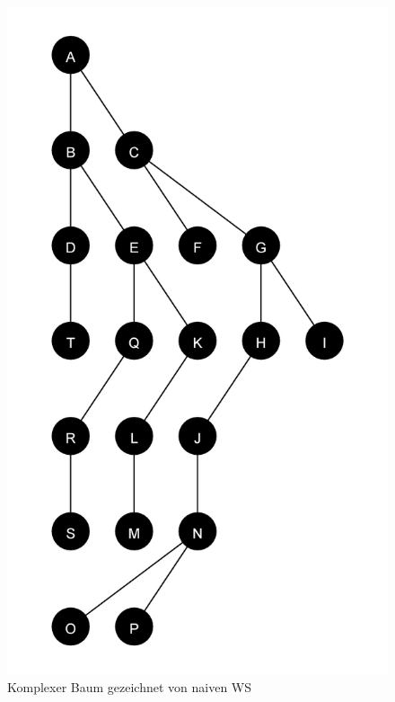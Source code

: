 \begin{figure}[ht]
    \centering
    \includegraphics[scale = 0.18]{abbildungen/komplex_a1}
    \caption{Komplexer Baum gezeichnet von naiven WS}
\end{figure}

